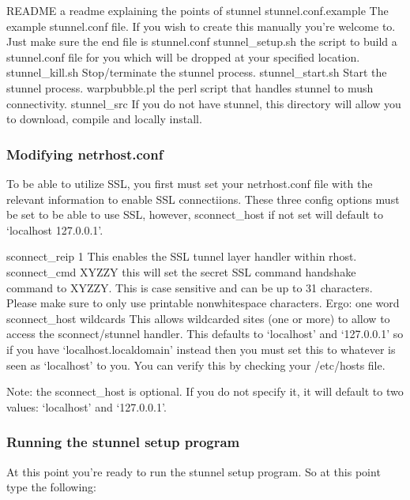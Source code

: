 \documentclass[letterpaper,10pt,english]{sphinxmanual}
\begin{document}
\sphinxAtStartPar
README                     \textendash{} a readme explaining the points of stunnel
stunnel.conf.example       \textendash{} The example stunnel.conf file.  If you wish to create this manually you’re welcome to.  Just make sure the end file is stunnel.conf
stunnel\_setup.sh           \textendash{} the script to build a stunnel.conf file for you which will be dropped at your specified location.
stunnel\_kill.sh            \textendash{} Stop/terminate the stunnel process.
stunnel\_start.sh           \textendash{} Start the stunnel process.
warpbubble.pl              \textendash{} the perl script that handles stunnel to mush connectivity.
stunnel\_src                \textendash{} If you do not have stunnel, this directory will allow you to download, compile and locally install.


\subsubsection{Modifying netrhost.conf}
\label{\detokenize{security:modifying-netrhost-conf}}
\sphinxAtStartPar
To be able to utilize SSL, you first must set your netrhost.conf file with
the relevant information to enable SSL connectiions.  These three config
options must be set to be able to use SSL, however, sconnect\_host if
not set will default to ‘localhost 127.0.0.1’.

\sphinxAtStartPar
sconnect\_reip 1         \textendash{} This enables the SSL tunnel layer handler within rhost.
sconnect\_cmd XYZZY      \textendash{} this will set the secret SSL command handshake command to XYZZY.  This is case sensitive and can be up to 31 characters.  Please make sure to only use printable non\sphinxhyphen{}whitespace characters.  Ergo: one word
sconnect\_host wildcards \textendash{} This allows wildcarded sites (one or more) to allow to access the sconnect/stunnel handler.  This defaults to ‘localhost’ and ‘127.0.0.1’ so if you have ‘localhost.localdomain’ instead then you must set this to whatever is seen as ‘localhost’ to you.  You can verify this by checking your /etc/hosts file.

\sphinxAtStartPar
Note: the sconnect\_host is optional.  If you do not specify it, it will default to two values:  ‘localhost’ and ‘127.0.0.1’.


\subsubsection{Running the stunnel setup program}
\label{\detokenize{security:running-the-stunnel-setup-program}}
\sphinxAtStartPar
At this point you’re ready to run the stunnel setup program.  So at this point type the following:
\end{document}
